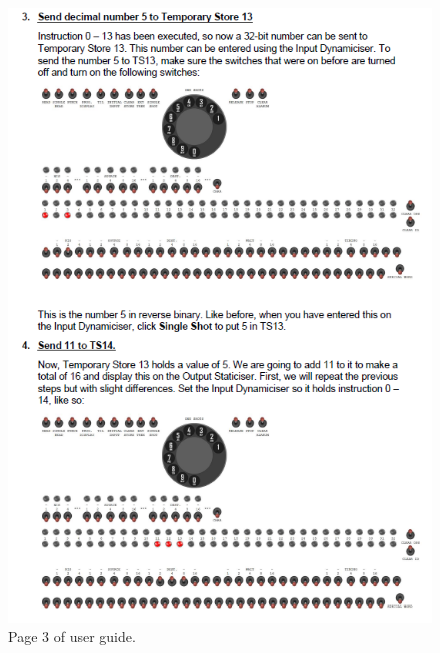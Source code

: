 \documentclass{l4proj}
\begin{document}
\begin{appendices}
\begin{figure}
	\centering
	\includegraphics{images/ug-3}
	\caption{Page 3 of user guide.}
	\label{fig:pg-3}
\end{figure}


\end{appendices}
\end{document}
